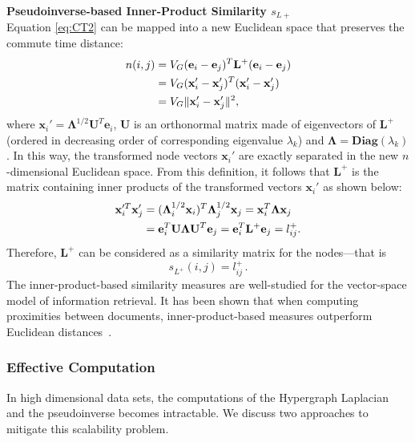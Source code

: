 \textbf{Pseudoinverse-based Inner-Product Similarity $s_{L+}$}\\
Equation \ref{eq:CT2} can be mapped into a new Euclidean space that preserves the commute time distance:
\begin{align}
\notag n(i,j)&=V_G(\mathbf{e}_i-\mathbf{e}_j)^T\mathbf{L}^+(\mathbf{e}_i-\mathbf{e}_j)\\
\notag &=V_G(\mathbf{x}_i'-\mathbf{x}_j')^T(\mathbf{x}_i'-\mathbf{x}_j')\\
&=V_G\|\mathbf{x}_i'-\mathbf{x}_j'\|^2, \label{eq:ECTD}
\end{align}
where $\mathbf{x}_i'=\mathbf{\Lambda}^{1/2}\mathbf{U}^T\mathbf{e}_i$, $\mathbf{U}$ is an orthonormal matrix made of eigenvectors of $\mathbf{L}^+$ (ordered in decreasing order of corresponding eigenvalue $\lambda_k$) and $\mathbf{\Lambda}=\mathbf{Diag}(\lambda_k)$. In this way, the transformed node vectors $\mathbf{x}_i'$ are exactly separated in the new $n$-dimensional Euclidean space.
From this definition, it follows that $\mathbf{L}^+ $ is the matrix containing inner products of the transformed vectors $\mathbf{x}_i'$ as shown below:
\begin{align}
\notag \mathbf{x}_i'^T\mathbf{x}_j'&=(\mathbf{\Lambda}_i^{1/2}\mathbf{x}_i)^T\mathbf{\Lambda}_j^{1/2}\mathbf{x}_j=\mathbf{x}_i^T\mathbf{\Lambda}\mathbf{x}_j\\
&=\mathbf{e}_i^T\mathbf{U\Lambda U}^T\mathbf{e}_j=\mathbf{e}_i^T\mathbf{L}^+\mathbf{e}_j=l_{ij}^+.
\end{align}
Therefore, $\mathbf{L}^+$ can be considered as a similarity matrix for the nodes---that is
\begin{equation}
s_{L^+}(i,j)=l_{ij}^+ \, . \label{eq:sim_L+}
\end{equation}
The inner-product-based similarity measures are well-studied for the vector-space model of information retrieval. It has been shown that when computing proximities between documents, inner-product-based measures outperform Euclidean distances~\cite{IR}.

\subsubsection{Effective Computation}
\label{sec:eff_comp}
In high dimensional data sets, the computations of the Hypergraph Laplacian and the pseudoinverse becomes intractable. We discuss two approaches to mitigate this scalability problem.


